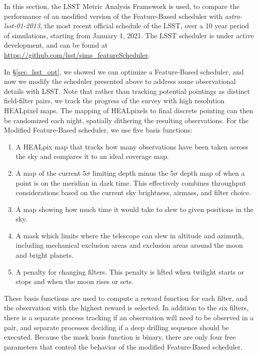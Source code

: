 \documentclass[12pt]{aastex62}
\theoremstyle{definition}
\begin{document}
In this section, the LSST Metric Analysis Framework \citep{jones2014lsst} is used, to compare the performance of an modified version of the Feature-Based scheduler with \textit{astro-lsst-01-2013}, the most recent official schedule of the LSST, over a 10 year period of simulations, starting from January 1, 2021.  The LSST scheduler is under active development, and can be found at \url{https://github.com/lsst/sims_featureScheduler}.


In \S\ref{sec_lsst_opt}, we showed we can optimize a Feature-Based scheduler, and now we modify the scheduler presented above to address some observational details with LSST.  Note that rather than tracking potential pointings as distinct field-filter pairs, we track the progress of the survey with high resolution HEALpixel maps. The mapping of HEALpixels to final discrete pointing can then be randomized each night, spatially dithering the resulting observations. For the Modified Feature-Based scheduler, we use five basis functions:
\begin{enumerate}
\item{A HEALpix map that tracks how many observations have been taken across the sky and compares it to an ideal coverage map.}
\item{A map of the current 5$\sigma$ limiting depth minus the 5$\sigma$ depth map of when a point is on the meridian in dark time. This effectively combines throughput considerations based on the current sky brightness, airmass, and filter choice.}
\item{A map showing how much time it would take to slew to given positions in the sky.}
\item{A mask which limits where the telescope can slew in altitude and azimuth, including mechanical exclusion areas and exclusion areas around the moon and bright planets.}
\item{A penalty for changing filters. This penalty is lifted when twilight starts or stops and when the moon rises or sets.}
\end{enumerate}
These basis functions are used to compute a reward function for each filter, and the observation with the highest reward is selected. In addition to the six filters, there is a separate process tracking if an observation will need to be observed in a pair, and separate processes deciding if a deep drilling sequence should be executed. Because the mask basis function is binary, there are only four free parameters that control the behavior of the modified Feature-Based scheduler. 
\end{document}
